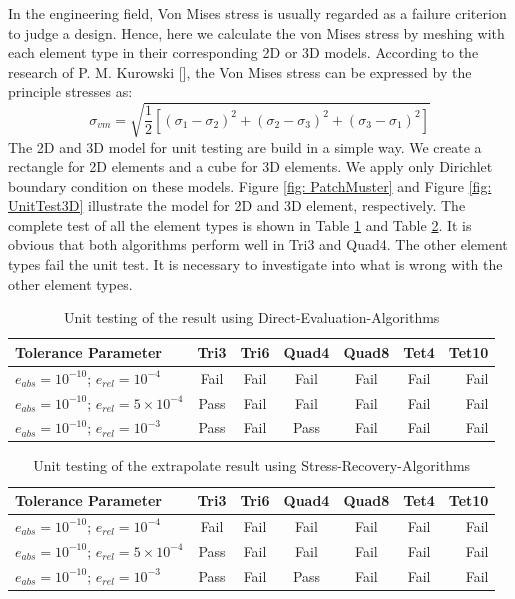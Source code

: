 In the engineering field, Von Mises stress is usually regarded as a failure criterion to judge a design. Hence, here we calculate the von Mises stress by meshing with each element type in their corresponding 2D or 3D models. According to the research of P. M. Kurowski [\cite{VonMiese}], the Von Mises stress can be expressed by the principle stresses as:
\begin{equation}
\sigma_{vm} = \sqrt{\frac{1}{2}\left[\left(\sigma_1 - \sigma_2\right)^2 + \left(\sigma_2 - \sigma_3\right)^2 + \left(\sigma_3 - \sigma_1\right)^2\right]}
\end{equation}
The 2D and 3D model for unit testing are build in a simple way. We create a rectangle for 2D elements and a cube for 3D elements. We apply only Dirichlet boundary condition on these models. Figure \ref{fig: PatchMuster} and Figure \ref{fig: UnitTest3D} illustrate the model for 2D and 3D element, respectively. 
The complete test of all the element types is shown in Table \ref{tab: DirectTesting} and Table \ref{tab: SRTesting}. It is obvious that both algorithms perform well in Tri3 and Quad4. The other element types fail the unit test. It is necessary to investigate into what is wrong with the other element types. 

\begin{table} 		
	\caption{Unit testing of the result using Direct-Evaluation-Algorithms}
	\label{tab: DirectTesting}
\begin{tabular}{l*{5}{c}r} 

	Tolerance Parameter              & Tri3 & Tri6 & Quad4 & Quad8 & Tet4  & Tet10  \\
	\hline
	$e_{abs}=10^{-10}$; $e_{rel}=10^{-4}$ & Fail & Fail & Fail & Fail & Fail & Fail   \\
	$e_{abs}=10^{-10}$; $e_{rel}=5\times10^{-4}$&  Pass& Fail & Fail & Fail & Fail &  Fail  \\
	$e_{abs}=10^{-10}$; $e_{rel}=10^{-3}$ & Pass & Fail & Pass & Fail &  Fail & Fail   \\
   \hline
\end{tabular}
\end{table}

\begin{table} 		
	\caption{Unit testing of the extrapolate result using Stress-Recovery-Algorithms}
	\label{tab: SRTesting}
	\begin{tabular}{l*{5}{c}r} 
		
		Tolerance Parameter    & Tri3 & Tri6 & Quad4 & Quad8 & Tet4  & Tet10  \\
		\hline
		$e_{abs}=10^{-10}$; $e_{rel}=10^{-4}$ & Fail & Fail & Fail & Fail & Fail & Fail   \\
		$e_{abs}=10^{-10}$; $e_{rel}=5\times10^{-4}$&  Pass& Fail & Fail & Fail & Fail &  Fail  \\
		$e_{abs}=10^{-10}$; $e_{rel}=10^{-3}$ & Pass & Fail & Pass & Fail &  Fail & Fail   \\
		\hline
	\end{tabular}
\end{table}

